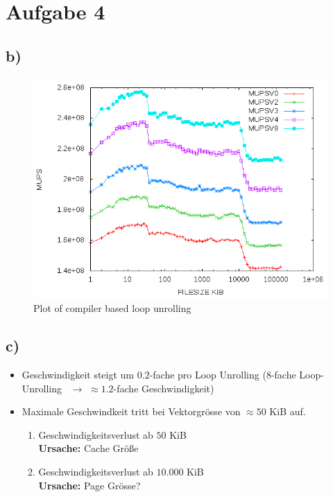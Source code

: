 \documentclass{article}
\begin{document}
\section*{Aufgabe 4}
\subsection*{b)}

\begin{center}
	\begin{figure}[h]
	\includegraphics[scale=0.6]{pics/a4b.png}
	\caption{Plot of compiler based loop unrolling}
	\end{figure}
\end{center}

\subsection*{c)}
\begin{itemize}
	\item Geschwindigkeit steigt um $0.2$-fache pro Loop Unrolling ($8$-fache Loop-Unrolling \
		$\rightarrow$ $\approx 1.2$-fache Geschwindigkeit)
	\item Maximale Geschwindkeit tritt bei Vektorgr\"osse von $\approx 50$ KiB auf.
		\begin{enumerate}
			\item Geschwindigkeitsverlust ab $50$ KiB\\ \textbf{Ursache:} Cache Größe
			\item Geschwindigkeitsverlust ab $10.000$ KiB\\ \textbf{Ursache:} Page Gr\"osse?
		\end{enumerate}
\end{itemize}
\end{document}
